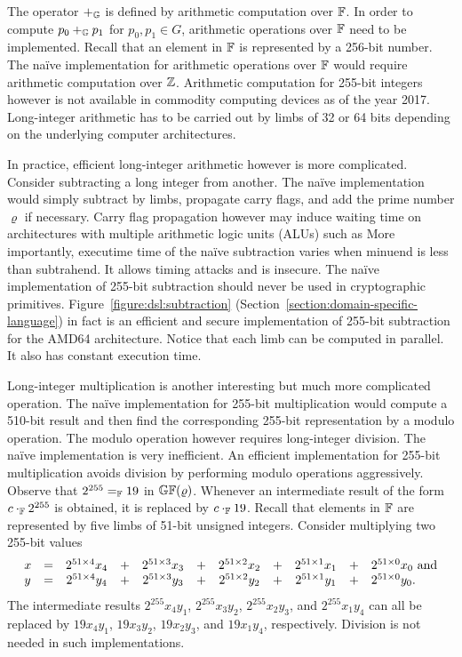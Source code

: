  
The operator $+_{\mathbb{G}}$ is defined by arithmetic computation over
$\mathbb{F}$. In order to compute $p_0 +_{\mathbb{G}} p_1$ for $p_0, p_1 \in G$,
arithmetic operations over $\mathbb{F}$ need to be implemented. Recall that
an element in $\mathbb{F}$ is represented by a 256-bit number. The na\"ive
implementation for arithmetic operations over $\mathbb{F}$ would require
arithmetic computation over $\mathbb{Z}$. Arithmetic computation for
255-bit integers however is not available in commodity computing
devices as of the year 2017. Long-integer arithmetic has to be carried
out by limbs of 32 or 64 bits depending on the underlying computer
architectures.

In practice, efficient long-integer arithmetic however is more
complicated. Consider subtracting a long integer from another. The
na\"ive implementation would simply subtract by limbs, propagate carry
flags, and add the prime number $\varrho$ if necessary. Carry flag
propagation however may induce waiting time on architectures with
multiple arithmetic logic units (ALUs) such as  
More importantly, executime time of the na\"ive subtraction varies
when minuend is less than subtrahend. It allows timing attacks and is
insecure. The na\"ive implementation of 255-bit subtraction should
never be used in cryptographic primitives. 
Figure~\ref{figure:dsl:subtraction}
(Section~\ref{section:domain-specific-language}) in fact is an
efficient and secure implementation of 255-bit subtraction for the
AMD64 architecture. Notice that each limb can be computed in
parallel. It also has constant execution time. 

Long-integer multiplication is another interesting but much more
complicated operation. The na\"ive implementation for 255-bit
multiplication would compute a 510-bit result and then find the
corresponding 255-bit representation by a modulo operation. The
modulo operation however requires long-integer division. The na\"ive
implementation is very inefficient. An efficient implementation for
255-bit multiplication avoids division by performing modulo operations
aggressively. Observe that $2^{255} =_{\mathbb{F}} 19$ in $\mathbb{GF}(\varrho)$. 
Whenever an intermediate result of the form $c \cdot_{\mathbb{F}} 2^{255}$
is obtained, it is replaced by $c \cdot_{\mathbb{F}} 19$. Recall that
elements in $\mathbb{F}$ are represented by five limbs of 51-bit unsigned
integers. Consider multiplying two 255-bit values
\begin{equation*}
  \begin{array}{lcccccccccl}
    x & = & 2^{51 \times 4} x_4 & + & 2^{51 \times 3} x_3 & + &
            2^{51 \times 2} x_2 & + & 2^{51 \times 1} x_1 & + &
            2^{51 \times 0} x_0 \textmd{ and}\\
    y & = & 2^{51 \times 4} y_4 & + & 2^{51 \times 3} y_3 & + &
            2^{51 \times 2} y_2 & + & 2^{51 \times 1} y_1 & + &
            2^{51 \times 0} y_0.
  \end{array}
\end{equation*}
The intermediate results $2^{255} x_4 y_1$, $2^{255} x_3 y_2$,
$2^{255} x_2 y_3$, and $2^{255} x_1 y_4$ can all be replaced by 
$19 x_4 y_1$, $19 x_3 y_2$, $19 x_2 y_3$, and $19 x_1 y_4$,
respectively. Division is not needed in such implementations.


